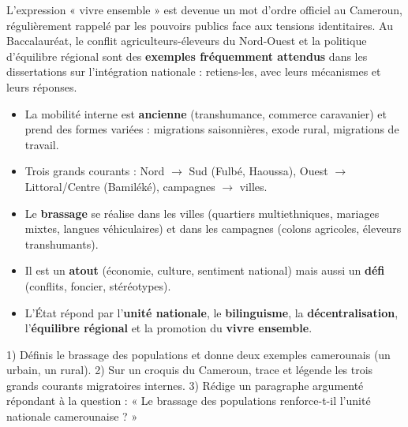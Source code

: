 \documentclass[11pt]{article}
\begin{document}
\begin{savaistu}
L'expression « vivre ensemble » est devenue un mot d'ordre officiel au Cameroun, régulièrement rappelé par les pouvoirs publics face aux tensions identitaires. Au Baccalauréat, le conflit agriculteurs-éleveurs du Nord-Ouest et la politique d'équilibre régional sont des \textbf{exemples fréquemment attendus} dans les dissertations sur l'intégration nationale : retiens-les, avec leurs mécanismes et leurs réponses.
\end{savaistu}

\begin{aretenir}
\begin{itemize}
\item La mobilité interne est \textbf{ancienne} (transhumance, commerce caravanier) et prend des formes variées : migrations saisonnières, exode rural, migrations de travail.
\item Trois grands courants : Nord $\rightarrow$ Sud (Fulbé, Haoussa), Ouest $\rightarrow$ Littoral/Centre (Bamiléké), campagnes $\rightarrow$ villes.
\item Le \textbf{brassage} se réalise dans les villes (quartiers multiethniques, mariages mixtes, langues véhiculaires) et dans les campagnes (colons agricoles, éleveurs transhumants).
\item Il est un \textbf{atout} (économie, culture, sentiment national) mais aussi un \textbf{défi} (conflits, foncier, stéréotypes).
\item L'État répond par l'\textbf{unité nationale}, le \textbf{bilinguisme}, la \textbf{décentralisation}, l'\textbf{équilibre régional} et la promotion du \textbf{vivre ensemble}.
\end{itemize}
\end{aretenir}

\begin{exercice}
1) Définis le brassage des populations et donne deux exemples camerounais (un urbain, un rural). 2) Sur un croquis du Cameroun, trace et légende les trois grands courants migratoires internes. 3) Rédige un paragraphe argumenté répondant à la question : « Le brassage des populations renforce-t-il l'unité nationale camerounaise ? »
\end{exercice}
\end{document}
